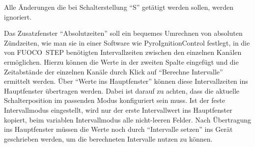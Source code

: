 \documentclass[paper=a4, open=any]{scrbook}
\begin{document}
				Alle Änderungen die bei Schalterstellung \enquote{S} getätigt werden sollen, werden ignoriert.

				Das Zusatzfenster \enquote{Absolutzeiten} soll ein bequemes Umrechnen von absoluten Zündzeiten, wie man sie in einer Software wie PyroIgnitionControl festlegt, in die von FUOCO~STEP benötigten Intervallzeiten zwischen den einzelnen Kanälen ermöglichen. Hierzu können die Werte in der zweiten Spalte eingefügt und die Zeitabstände der einzelnen Kanäle durch Klick auf \enquote{Berechne Intervalle} ermittelt werden. Über \enquote{Werte ins Hauptfenster} können diese Intervallzeiten ins Hauptfenster übertragen werden. Dabei ist darauf zu achten, dass die aktuelle Schalterposition im passenden Modus konfiguriert sein muss. Ist der feste Intervallmodus eingestellt, wird nur der erste Intervallwert ins Hauptfenster kopiert, beim variablen Intervallmodus alle nicht-leeren Felder. Nach Übertragung ins Hauptfenster müssen die Werte noch durch \enquote{Intervalle setzen} ins Gerät geschrieben werden, um die berechneten Intervalle nutzen zu können.
\end{document}
